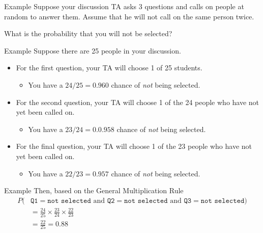 \begin{frame}{Example}
    Suppose your discussion TA asks 3 questions and calls on people at random to answer them. Assume that he will not call on the same person twice.
    
    \vspace{12pt}What is the probability that you will not be selected?
\end{frame}

\begin{frame}{Example}
    Suppose there are 25 people in your discussion. 
    \begin{itemize}
        \item For the first question, your TA will choose 1 of 25 students.
        \begin{itemize}
            \item You have a $24/25=0.960$ chance of \textit{not} being selected.
        \end{itemize}
        \item For the second question, your TA will choose 1 of the 24 people who have not yet been called on.
        \begin{itemize}
            \item You have a $23/24=0.0.958$ chance of \textit{not} being selected.
        \end{itemize}
        \item For the final question, your TA will choose 1 of the 23 people who have not yet been called on.
        \begin{itemize}
            \item You have a $22/23=0.957$ chance of \textit{not} being selected.
        \end{itemize}
    \end{itemize}
\end{frame}

\begin{frame}{Example}
    Then, based on the General Multiplication Rule
    \small{\begin{align*}
        P(&\texttt{Q1}=\texttt{not selected}\text{ and } \texttt{Q2}=\texttt{not selected}\text{ and } \texttt{Q3}=\texttt{not selected}) \\
        &= \frac{24}{25}\times \frac{23}{24}\times \frac{22}{23} \\
        &= \frac{22}{25} = 0.88
    \end{align*}}
\end{frame}

